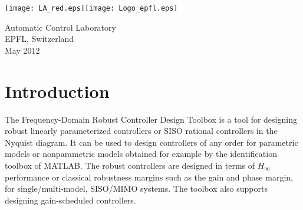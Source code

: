 \documentclass [12pt , a4paper] {report}
\begin{document}


\begin{titlepage}

\vspace{1cm}


\vspace*{0.5cm}

\vspace{6cm}



\vspace{2cm}


\begin{center}

\texttt{[image: LA\_red.eps]}\hspace{5cm}\texttt{[image: Logo\_epfl.eps]}

\vspace*{0.5cm}

{Automatic Control Laboratory\\
EPFL, Switzerland\\
May 2012}
\end{center}
\end{titlepage}


\tableofcontents

\chapter{Introduction}
The Frequency-Domain Robust Controller Design Toolbox is a tool for designing robust linearly parameterized controllers or SISO rational controllers in the Nyquist diagram. It can be used to design controllers of any order for parametric models or nonparametric models obtained for example by the identification toolbox of MATLAB. The robust controllers are designed in terms of $H_\infty$ performance or classical robustness margins such as the gain and phase margin, for single/multi-model, SISO/MIMO systems.  The toolbox also supports designing gain-scheduled controllers. 
\end{document}
